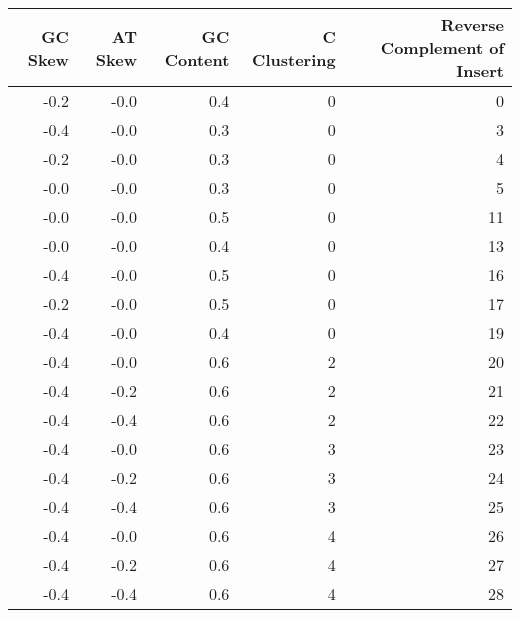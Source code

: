 \begin{table}[H]
\centering
\caption{}
\label{table:2}
\begin{tabular}{rrrrr}
\toprule
 GC Skew &  AT Skew &  GC Content &  C Clustering &  Reverse Complement of Insert \\
\midrule
    -0.2 &     -0.0 &         0.4 &             0 &                             0 \\
    -0.4 &     -0.0 &         0.3 &             0 &                             3 \\
    -0.2 &     -0.0 &         0.3 &             0 &                             4 \\
    -0.0 &     -0.0 &         0.3 &             0 &                             5 \\
    -0.0 &     -0.0 &         0.5 &             0 &                            11 \\
    -0.0 &     -0.0 &         0.4 &             0 &                            13 \\
    -0.4 &     -0.0 &         0.5 &             0 &                            16 \\
    -0.2 &     -0.0 &         0.5 &             0 &                            17 \\
    -0.4 &     -0.0 &         0.4 &             0 &                            19 \\
    -0.4 &     -0.0 &         0.6 &             2 &                            20 \\
    -0.4 &     -0.2 &         0.6 &             2 &                            21 \\
    -0.4 &     -0.4 &         0.6 &             2 &                            22 \\
    -0.4 &     -0.0 &         0.6 &             3 &                            23 \\
    -0.4 &     -0.2 &         0.6 &             3 &                            24 \\
    -0.4 &     -0.4 &         0.6 &             3 &                            25 \\
    -0.4 &     -0.0 &         0.6 &             4 &                            26 \\
    -0.4 &     -0.2 &         0.6 &             4 &                            27 \\
    -0.4 &     -0.4 &         0.6 &             4 &                            28 \\
\bottomrule
\end{tabular}
\end{table}
